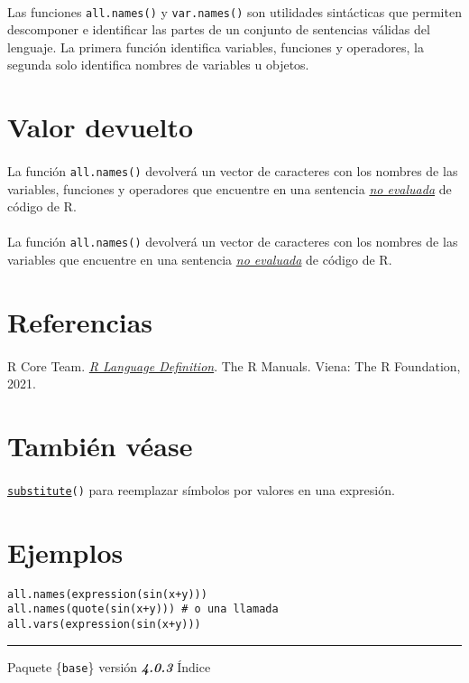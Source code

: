 \documentclass{article}[letter, 12pt]
\def\code#1{\texttt{#1}}
\begin{document}
\paragraph{}
Las funciones \code{all.names()} y \code{var.names()} son utilidades sintácticas que permiten descomponer e identificar las partes de un conjunto de sentencias válidas del lenguaje. La primera función identifica variables, funciones y operadores, la segunda solo identifica nombres de variables u objetos.
\section{\color{gray}Valor devuelto}
\paragraph{}
La función \code{all.names()} devolverá un vector de caracteres con los nombres de las variables, funciones y operadores que encuentre en una sentencia \href{run:/Vocabulary.pdf}{\textit{no evaluada}} de código de R.
\paragraph{}
La función \code{all.names()} devolverá un vector de caracteres con los nombres de las variables que encuentre en una sentencia \href{run:/Vocabulary.pdf}{\textit{no evaluada}} de código de R.
\section{\color{gray}Referencias}
\paragraph{}
R Core Team. \href{run:https://cran.r-project.org/doc/manuals/R-lang.html}{\textit{R Language Definition}}. The R Manuals. Viena: The R Foundation, 2021.
\section{\color{gray}También véase}
\paragraph{}
\href{run:/Vocabulary.pdf}{\code{substitute}}\code{()} para reemplazar símbolos por valores en una expresión.
\section{\color{gray}Ejemplos}
\code{all.names(expression(sin(x+y)))} \\
\code{all.names(quote(sin(x+y)))  \# o una llamada} \\
\code{all.vars(expression(sin(x+y)))} \\
\par\noindent\rule{\textwidth}{0.4pt}
\centerline{Paquete \{\code{base}\} versión \textbf{\emph{4.0.3}} Índice}
\end{document}

